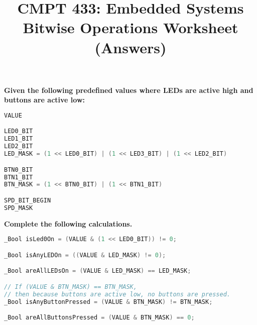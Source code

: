 \documentclass[11pt, oneside, letterpaper]{article}
\title{CMPT 433: Embedded Systems \\\medskip \Large Bitwise Operations Worksheet (Answers)}
\author{}
\date{}
\begin{document}
	\maketitle
	
	\textbf{Given the following predefined values where LEDs are active high and buttons are active low:}

\begin{lstlisting}[language=C, columns=fixed]
VALUE

LED0_BIT
LED1_BIT
LED2_BIT
LED_MASK = (1 << LED0_BIT) | (1 << LED3_BIT) | (1 << LED2_BIT) 

BTN0_BIT
BTN1_BIT
BTN_MASK = (1 << BTN0_BIT) | (1 << BTN1_BIT)

SPD_BIT_BEGIN
SPD_MASK
\end{lstlisting}

\vspace{1cm}

\textbf{Complete the following calculations.}

\begin{lstlisting}[language=C, columns=fixed]
_Bool isLed0On = (VALUE & (1 << LED0_BIT)) != 0;

_Bool isAnyLEDOn = ((VALUE & LED_MASK) != 0);

_Bool areAllLEDsOn = (VALUE & LED_MASK) == LED_MASK;

// If (VALUE & BTN_MASK) == BTN_MASK,
// then because buttons are active low, no buttons are pressed.
_Bool isAnyButtonPressed = (VALUE & BTN_MASK) != BTN_MASK;

_Bool areAllButtonsPressed = (VALUE & BTN_MASK) == 0;
\end{lstlisting}

\clearpage
\end{document}
